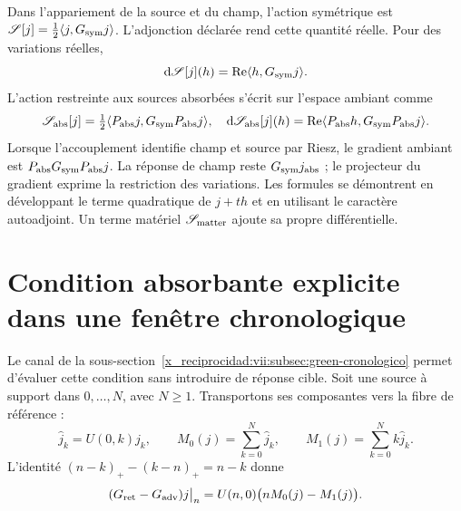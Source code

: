 Dans l'appariement de la source et du champ, l'action symétrique est
\(\mathscr S[j]=\tfrac12\langle j,G_{\rm sym}j\rangle\).
L'adjonction déclarée rend cette quantité réelle. Pour des variations réelles,
\[
 \mathrm d\mathscr S[j](h)
 =\operatorname{Re}\langle h,G_{\rm sym}j\rangle.
\]
L'action restreinte aux sources absorbées s'écrit sur l'espace ambiant comme
\begin{equation}
 \mathscr S_{\rm abs}[j]
 =\tfrac12\langle P_{\rm abs}j,G_{\rm sym}P_{\rm abs}j\rangle,
 \quad
 \mathrm d\mathscr S_{\rm abs}[j](h)
 =\operatorname{Re}\langle P_{\rm abs}h,G_{\rm sym}P_{\rm abs}j\rangle.
 \label{x_reciprocidad:vii:eq:variacion-restringida-absorcion}
\end{equation}
Lorsque l'accouplement identifie champ et source par Riesz, le gradient ambiant est \(P_{\rm abs}G_{\rm sym}P_{\rm abs}j\). La réponse de champ reste \(G_{\rm sym}j_{\rm abs}\) ; le projecteur du gradient exprime la restriction des variations. Les formules se démontrent en développant le terme quadratique de \(j+th\) et en utilisant le caractère autoadjoint. Un terme matériel \(\mathscr S_{\rm matter}\) ajoute sa propre différentielle.

\section{Condition absorbante explicite dans une fenêtre chronologique}
\label{x_reciprocidad:vii:subsec:absorcion-momentos}

Le canal de la sous-section~\ref{x_reciprocidad:vii:subsec:green-cronologico} permet
d'évaluer cette condition sans introduire de réponse cible. Soit une
source à support dans \(0,\ldots,N\), avec \(N\geq1\). Transportons
ses composantes vers la fibre de référence :
\[
 \widehat j_k=U(0,k)j_k,\qquad
 M_0(j)=\sum_{k=0}^N\widehat j_k,\qquad
 M_1(j)=\sum_{k=0}^Nk\widehat j_k.
\]
L'identité \((n-k)_+-(k-n)_+=n-k\) donne
\begin{equation}
 (G_{\rm ret}-G_{\rm adv})j\big|_n
 =U(n,0)\bigl(nM_0(j)-M_1(j)\bigr).
 \label{x_reciprocidad:vii:eq:diferencia-green-momentos}
\end{equation}

